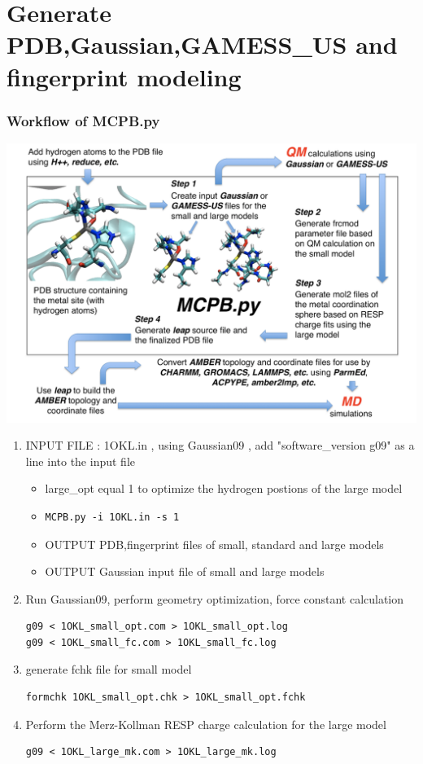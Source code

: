 \documentclass[hyperref={breaklinks,colorlinks}]{beamer}
\begin{document}
\section{Generate PDB,Gaussian,GAMESS\_US and fingerprint modeling}
\begin{frame}
  \frametitle{Workflow of MCPB.py}
  {\centering
  \includegraphics[scale=.35]{step.png}\par}
\end{frame}

\begin{frame}[fragile]

  \begin{enumerate}
    \frametitle{Generate file}
  \item INPUT FILE : 1OKL.in , using Gaussian09 , add
    "software\_version g09" as a line into the input file
    \begin{itemize}
    \item large\_opt equal 1 to optimize the hydrogen postions of the
      large model
    \item
\begin{lstlisting}
MCPB.py -i 1OKL.in -s 1
\end{lstlisting}
    \item OUTPUT PDB,fingerprint files of small, standard and large
      models
    \item OUTPUT Gaussian input file of small and large models
    \end{itemize}
  \item Run Gaussian09, perform geometry optimization, force constant
    calculation
\begin{lstlisting}
g09 < 1OKL_small_opt.com > 1OKL_small_opt.log
g09 < 1OKL_small_fc.com > 1OKL_small_fc.log 
\end{lstlisting}
  \item generate fchk file for small model
\begin{lstlisting}
formchk 1OKL_small_opt.chk > 1OKL_small_opt.fchk 
\end{lstlisting}
  \item Perform the Merz-Kollman RESP charge calculation for the large
    model
\begin{lstlisting}
g09 < 1OKL_large_mk.com > 1OKL_large_mk.log 
\end{lstlisting}
  \end{enumerate}
\end{frame}
\end{document}
